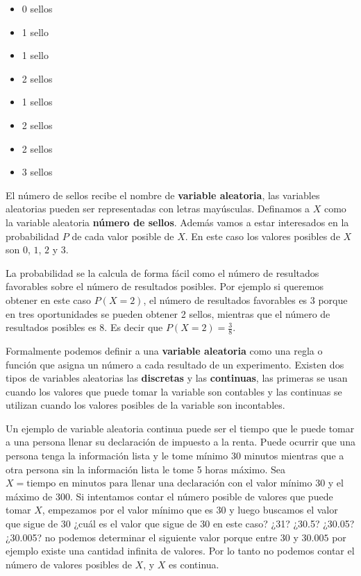 \documentclass[letterpaper,]{book}
\providecommand{\tightlist}{%
  \setlength{\itemsep}{0pt}\setlength{\parskip}{0pt}}
\begin{document}
\begin{itemize}
\tightlist
\item
  0 sellos
\item
  1 sello
\item
  1 sello
\item
  2 sellos
\item
  1 sellos
\item
  2 sellos
\item
  2 sellos
\item
  3 sellos
\end{itemize}

El número de sellos recibe el nombre de \textbf{variable aleatoria}, las variables aleatorias pueden ser representadas con letras mayúsculas. Definamos a \(X\) como la variable aleatoria \textbf{número de sellos}. Además vamos a estar interesados en la probabilidad \(P\) de cada valor posible de \(X\). En este caso los valores posibles de \(X\) son \(0\), \(1\), \(2\) y \(3\).

La probabilidad se la calcula de forma fácil como el número de resultados favorables sobre el número de resultados posibles. Por ejemplo si queremos obtener en este caso \(P\left(X =2 \right)\), el número de resultados favorables es \(3\) porque en tres oportunidades se pueden obtener 2 sellos, mientras que el número de resultados posibles es 8. Es decir que \(P\left(X=2\right)= \frac{3}{8}\).

Formalmente podemos definir a una \textbf{variable aleatoria} como una regla o función que asigna un número a cada resultado de un experimento. Existen dos tipos de variables aleatorias las \textbf{discretas} y las \textbf{continuas}, las primeras se usan cuando los valores que puede tomar la variable son contables y las continuas se utilizan cuando los valores posibles de la variable son incontables.

Un ejemplo de variable aleatoria continua puede ser el tiempo que le puede tomar a una persona llenar su declaración de impuesto a la renta. Puede ocurrir que una persona tenga la información lista y le tome mínimo 30 minutos mientras que a otra persona sin la información lista le tome 5 horas máximo. Sea \(X= \text{tiempo en minutos para llenar una declaración}\) con el valor mínimo 30 y el máximo de 300. Si intentamos contar el número posible de valores que puede tomar \(X\), empezamos por el valor mínimo que es \(30\) y luego buscamos el valor que sigue de \(30\) ¿cuál es el valor que sigue de 30 en este caso? ¿31? ¿30.5? ¿30.05? ¿30.005? no podemos determinar el siguiente valor porque entre \(30\) y \(30.005\) por ejemplo existe una cantidad infinita de valores. Por lo tanto no podemos contar el número de valores posibles de \(X\), y \(X\) es continua.
\end{document}
